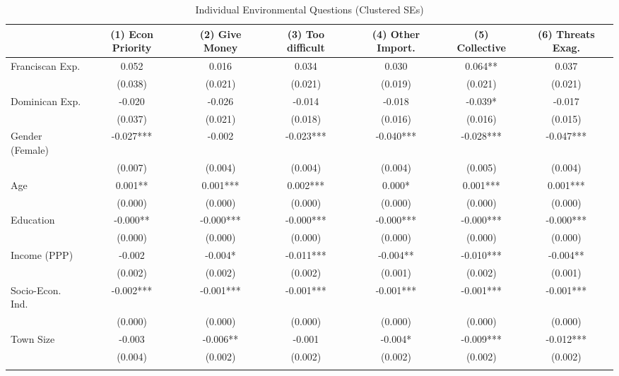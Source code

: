 \documentclass[12pt, a4paper]{article}
\begin{document}
\begin{table}[h!]
    \centering
    \caption{Individual Environmental Questions (Clustered SEs)}
    \label{tab:env_questions}
    \scriptsize
    \setlength{\tabcolsep}{0 pt}

\begin{tabular}{lcccccc}
\toprule
 & (1) Econ Priority & (2) Give Money & (3) Too difficult 
 & (4) Other Import. & (5) Collective & (6) Threats Exag. \\
\midrule

Franciscan Exp.
& 0.052 & 0.016 & 0.034 & 0.030 & 0.064** & 0.037 \\
& (0.038) & (0.021) & (0.021) & (0.019) & (0.021) & (0.021) \\
\addlinespace[0.2em]

Dominican Exp.
& -0.020 & -0.026 & -0.014 & -0.018 & -0.039* & -0.017 \\
& (0.037) & (0.021) & (0.018) & (0.016) & (0.016) & (0.015) \\
\addlinespace[0.2em]

Gender (Female)
& -0.027*** & -0.002 & -0.023*** & -0.040*** & -0.028*** & -0.047*** \\
& (0.007) & (0.004) & (0.004) & (0.004) & (0.005) & (0.004) \\
\addlinespace[0.2em]

Age
& 0.001** & 0.001*** & 0.002*** & 0.000* & 0.001*** & 0.001*** \\
& (0.000) & (0.000) & (0.000) & (0.000) & (0.000) & (0.000) \\
\addlinespace[0.2em]

Education
& -0.000** & -0.000*** & -0.000*** & -0.000*** & -0.000*** & -0.000*** \\
& (0.000) & (0.000) & (0.000) & (0.000) & (0.000) & (0.000) \\
\addlinespace[0.2em]

Income (PPP)
& -0.002 & -0.004* & -0.011*** & -0.004** & -0.010*** & -0.004** \\
& (0.002) & (0.002) & (0.002) & (0.001) & (0.002) & (0.001) \\
\addlinespace[0.2em]

Socio-Econ. Ind.
& -0.002*** & -0.001*** & -0.001*** & -0.001*** & -0.001*** & -0.001*** \\
& (0.000) & (0.000) & (0.000) & (0.000) & (0.000) & (0.000) \\
\addlinespace[0.2em]

Town Size
& -0.003 & -0.006** & -0.001 & -0.004* & -0.009*** & -0.012*** \\
& (0.004) & (0.002) & (0.002) & (0.002) & (0.002) & (0.002) \\
\addlinespace[0.2em]


\end{tabular}
\end{table}
\end{document}
